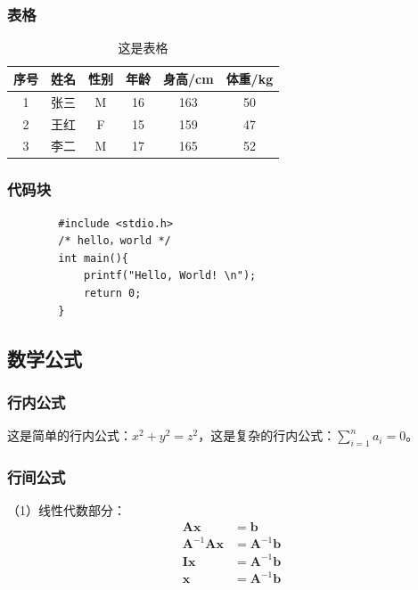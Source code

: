 \begin{ujnbody}
    \subsubsection{表格}
    \begin{table}[!htbp]
        \centering
        \caption{这是表格}
        \begin{tabular}{cccccc}
            \toprule
            序号 & 姓名 & 性别 & 年龄 & 身高/cm & 体重/kg \\
            \midrule
            1 & 张三 & M & 16 & 163 & 50 \\
            2 & 王红 & F & 15 & 159 & 47 \\
            3 & 李二 & M & 17 & 165 & 52 \\
            \bottomrule
        \end{tabular}
        \label{tab:1}
    \end{table}
    \subsubsection{代码块}
    \begin{lstlisting}
        #include <stdio.h>
        /* hello，world */
        int main(){
            printf("Hello, World! \n"); 
            return 0;
        }
    \end{lstlisting}
    \subsection{数学公式}
    \subsubsection{行内公式}
    这是简单的行内公式：$x^2+y^2=z^2$，这是复杂的行内公式：$\sum_{i=1}^n a_i=0$。
    \subsubsection{行间公式}
    （1）线性代数部分：
    \begin{equation}
        \begin{split}
            \mathbf{A}\mathbf{x} &= \mathbf{b} \\
            \mathbf{A}^{-1}\mathbf{A}\mathbf{x} &= \mathbf{A}^{-1}\mathbf{b} \\
            \mathbf{I}\mathbf{x} &= \mathbf{A}^{-1}\mathbf{b} \\
            \mathbf{x} &= \mathbf{A}^{-1}\mathbf{b}
        \end{split}
    \end{equation}


\end{ujnbody}
